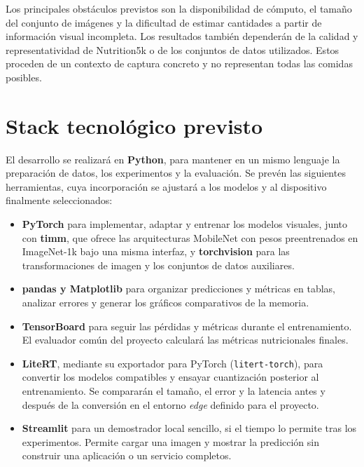 Los principales obstáculos previstos son la disponibilidad de cómputo, el
tamaño del conjunto de imágenes y la dificultad de estimar cantidades a partir
de información visual incompleta. Los resultados también dependerán de la
calidad y representatividad de Nutrition5k o de los conjuntos de datos utilizados. Estos
proceden de un contexto de captura concreto y no representan todas las comidas posibles.

\section{Stack tecnológico previsto}

El desarrollo se realizará en \textbf{Python}, para mantener en un mismo
lenguaje la preparación de datos, los experimentos y la evaluación. Se prevén
las siguientes herramientas, cuya incorporación se ajustará a los modelos y al
dispositivo finalmente seleccionados:

\begin{itemize}
  \item \textbf{PyTorch} para implementar, adaptar y entrenar los modelos
  visuales, junto con \textbf{timm}, que ofrece las arquitecturas MobileNet con
  pesos preentrenados en ImageNet-1k bajo una misma interfaz, y
  \textbf{torchvision} para las transformaciones de imagen y los conjuntos de
  datos auxiliares.
  \item \textbf{pandas y Matplotlib} para organizar predicciones y métricas en
  tablas, analizar errores y generar los gráficos comparativos de la memoria.
  \item \textbf{TensorBoard} para seguir las pérdidas y métricas durante el
  entrenamiento. El evaluador común del proyecto calculará las métricas
  nutricionales finales.
  \item \textbf{LiteRT}, mediante su exportador para PyTorch
  (\texttt{litert-torch}), para convertir los modelos compatibles y ensayar
  cuantización posterior al entrenamiento. Se compararán el tamaño, el error y
  la latencia antes y después de la conversión en el entorno \emph{edge}
  definido para el proyecto.
  \item \textbf{Streamlit} para un demostrador local sencillo, si el tiempo
  lo permite tras los experimentos. Permite cargar una imagen y
  mostrar la predicción sin construir una aplicación o un servicio completos.
\end{itemize}
